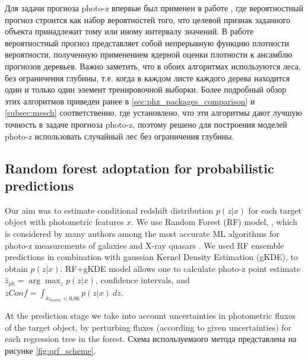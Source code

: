 \documentclass[fleqn,usenatbib]{mnras}
\begin{document}
Для задачи прогноза photo-z впервые был применен в работе \cite{bib:tpz}, где вероятностный прогноз строится как набор вероятностей того, что целевой признак заданного объекта принадлежит тому или иному интервалу значений. В работе \cite{bib:mesch} вероятностный прогноз представляет собой непрерывную функцию плотности вероятности, полученную применением ядерной оценки плотности к ансамблю прогнозов деревьев. Важно заметить, что в обоих алгоритмах используются леса, без ограничения глубины, т.е. когда в каждом листе каждого дерева находится один и только один элемент тренировочной выборки. Более подробный обзор этих алгоритмов приведен ранее в \ref{sec:phz_packages_comparison} и \ref{subsec:mesch} соответственно, где установлено, что эти алгоритмы дают лучшую точность в задаче прогноза photo-z, поэтому решено для построения моделей photo-z использовать случайный лес без ограничения глубины.

\subsection{Random forest adoptation for probabilistic predictions}
Our aim was to estimate conditional redshift distribution $p(z|x)$ for each target object with photometric features $x$.
We use Random Forest (RF) model, \citep{2001MachL..45....5B,JMLR:v7:meinshausen06a}, which is considered by many authors among the most accurate ML algorithms for photo-z measurements of galaxies \citep{2020MNRAS.499.1587S,2020arXiv200912112E} and X-ray quasars \citep{2018AstL...44..735M}. We used RF ensemble predictions in combination with gaussian Kernel Density Estimation (gKDE), to obtain $p(z|x)$. RF+gKDE model allows one to calculate photo-z point estimate $\hat{z}_{ph} = \arg\max_z p(z|x)$, confidence intervals, and $zConf = \int_{\delta z_{norm} < 0.06} p(z|x)~dz$.

At the prediction stage we take into account uncertainties in photometric fluxes of the target object, by perturbing  fluxes (according to given uncertainties) for each regression tree in the forest. Схема используемаого метода представлена на рисунке \ref{fig:qrf_scheme}.
\end{document}
